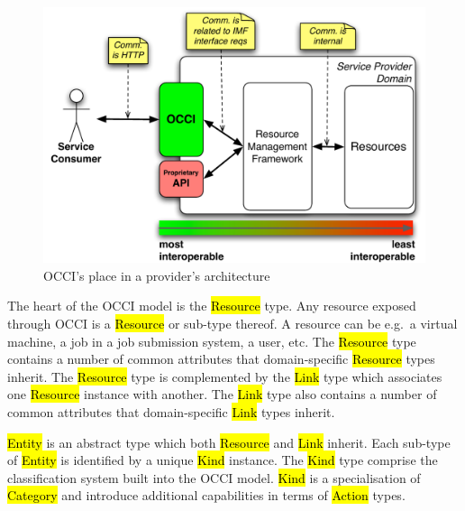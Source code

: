 \documentclass[10pt,a4paper,british]{article}
\begin{document}
\begin{figure}[!hp]
	\centering
	\includegraphics[scale=0.5]{figs/occi-intro.pdf}
	\caption{OCCI's place in a provider's architecture}
	\label{fig:placement}
\end{figure}

The heart of the OCCI model is the \hl{Resource} type. Any resource exposed
through OCCI is a \hl{Resource} or sub-type thereof.
A resource can be e.g.~a virtual machine, a job in a job submission system, a
user, etc.
%
The \hl{Resource} type contains a number of common attributes that
domain-specific \hl{Resource} types inherit. The \hl{Resource} type is
complemented by the \hl{Link} type which associates one \hl{Resource} instance
with another.
%
The \hl{Link} type also contains a number of common attributes that
domain-specific \hl{Link} types inherit.

\hl{Entity} is an abstract type which both \hl{Resource} and \hl{Link} inherit.
Each sub-type of \hl{Entity} is identified by a unique \hl{Kind} instance.
%
The \hl{Kind} type comprise the classification system built into the OCCI
model. \hl{Kind} is a specialisation of \hl{Category} and introduce additional
capabilities in terms of \hl{Action} types.
\end{document}
